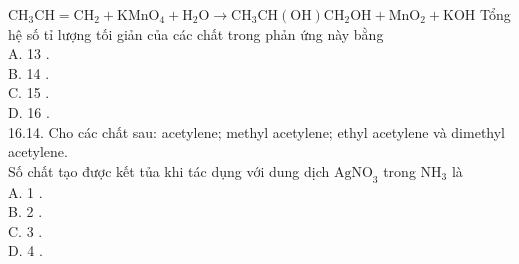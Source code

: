 \documentclass[10pt]{article}
\begin{document}
$\mathrm{CH}_{3} \mathrm{CH}=\mathrm{CH}_{2}+\mathrm{KMnO}_{4}+\mathrm{H}_{2} \mathrm{O} \longrightarrow \mathrm{CH}_{3} \mathrm{CH}(\mathrm{OH}) \mathrm{CH}_{2} \mathrm{OH}+\mathrm{MnO}_{2}+\mathrm{KOH}$ Tổng hệ số tỉ lượng tối giản của các chất trong phản ứng này bằng\\
A. 13 .\\
B. 14 .\\
C. 15 .\\
D. 16 .\\
16.14. Cho các chất sau: acetylene; methyl acetylene; ethyl acetylene và dimethyl acetylene.\\
Số chất tạo được kết tủa khi tác dụng với dung dịch $\mathrm{AgNO}_{3}$ trong $\mathrm{NH}_{3}$ là\\
A. 1 .\\
B. 2 .\\
C. 3 .\\
D. 4 .
\end{document}
